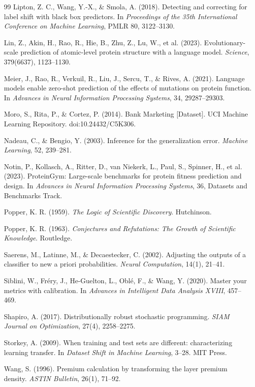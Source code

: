 \documentclass[11pt]{article}
\theoremstyle{remark}
\begin{document}
\begin{thebibliography}{99}
Lipton, Z. C., Wang, Y.-X., \& Smola, A. (2018).
Detecting and correcting for label shift with black box predictors.
In \emph{Proceedings of the 35th International Conference on Machine Learning}, PMLR 80, 3122--3130.

Lin, Z., Akin, H., Rao, R., Hie, B., Zhu, Z., Lu, W., et al. (2023).
Evolutionary-scale prediction of atomic-level protein structure with a language model.
\emph{Science}, 379(6637), 1123--1130.

Meier, J., Rao, R., Verkuil, R., Liu, J., Sercu, T., \& Rives, A. (2021).
Language models enable zero-shot prediction of the effects of mutations on protein function.
In \emph{Advances in Neural Information Processing Systems}, 34, 29287--29303.

Moro, S., Rita, P., \& Cortez, P. (2014).
Bank Marketing [Dataset].
UCI Machine Learning Repository. doi:10.24432/C5K306.

Nadeau, C., \& Bengio, Y. (2003).
Inference for the generalization error.
\emph{Machine Learning}, 52, 239--281.

Notin, P., Kollasch, A., Ritter, D., van Niekerk, L., Paul, S., Spinner, H., et al. (2023).
ProteinGym: Large-scale benchmarks for protein fitness prediction and design.
In \emph{Advances in Neural Information Processing Systems}, 36, Datasets and Benchmarks Track.

Popper, K. R. (1959).
\emph{The Logic of Scientific Discovery}.
Hutchinson.

Popper, K. R. (1963).
\emph{Conjectures and Refutations: The Growth of Scientific Knowledge}.
Routledge.

Saerens, M., Latinne, M., \& Decaestecker, C. (2002).
Adjusting the outputs of a classifier to new a priori probabilities.
\emph{Neural Computation}, 14(1), 21--41.

Siblini, W., Fr\'ery, J., He-Guelton, L., Obl\'e, F., \& Wang, Y. (2020).
Master your metrics with calibration.
In \emph{Advances in Intelligent Data Analysis XVIII}, 457--469.

Shapiro, A. (2017).
Distributionally robust stochastic programming.
\emph{SIAM Journal on Optimization}, 27(4), 2258--2275.

Storkey, A. (2009).
When training and test sets are different: characterizing learning transfer.
In \emph{Dataset Shift in Machine Learning}, 3--28. MIT Press.

Wang, S. (1996).
Premium calculation by transforming the layer premium density.
\emph{ASTIN Bulletin}, 26(1), 71--92.

\end{thebibliography}
\end{document}
